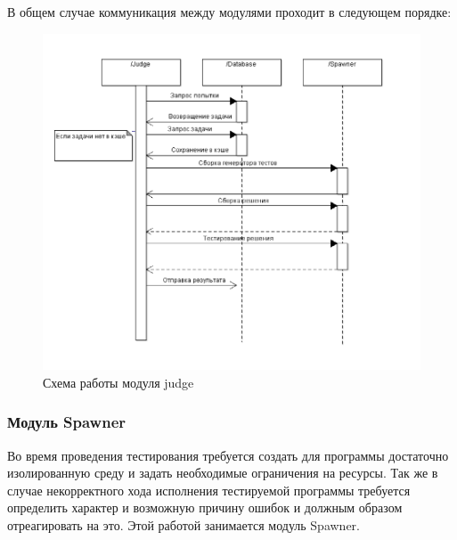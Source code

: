 \documentclass{imcs}
\begin{document}
В общем случае коммуникация между модулями проходит в следующем порядке:

\FloatBarrier
\begin{figure}[htb]
\centering
\includegraphics{./img/judgeinteraction.png}
\caption{Схема работы модуля judge}
\label{judgeinteraction}
\end{figure}

\FloatBarrier
\subsubsection{Модуль Spawner}

Во время проведения тестирования требуется создать для программы достаточно изолированную среду и задать необходимые ограничения на ресурсы. Так же в случае некорректного хода исполнения тестируемой программы требуется определить характер и возможную причину ошибок и должным образом отреагировать на это. Этой работой занимается модуль Spawner.
\end{document}
